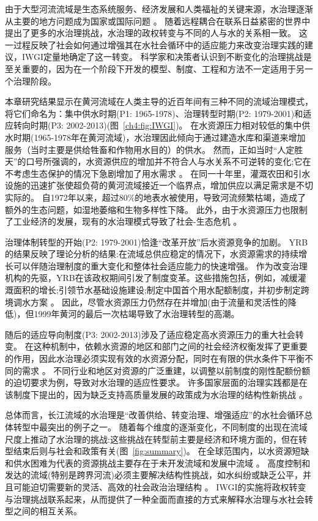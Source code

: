 
由于大型河流流域是生态系统服务、经济发展和人类福祉的关键来源，水治理逐渐从主要的地方问题成为国家或国际问题
\cite{best2019,best2020}。
随着远程耦合在联系日益紧密的世界中提出了更多的水治理挑战，水治理的政权转变与不同的人与水的关系相一致\cite{diaz2019}。
这一过程反映了社会如何通过增强其在水社会循环中的适应能力来改变治理实践的建议，IWGI定量地确定了这一转变\cite{loch2020,turton1999}。
科学家和决策者认识到不断变化的治理挑战是至关重要的，因为在一个阶段下开发的模型、制度、工程和方法不一定适用于另一个治理阶段\cite{reyers2018}。

本章研究结果显示在黄河流域在人类主导的近百年间有三种不同的流域治理模式，将它们命名为：集中供水时期(P1: 1965-1978)、治理转型时期(P2: 1979-2001)和适应转向时期(P3: 2002-2013)(图~\ref{ch4:fig:IWGI})。
在水资源压力相对较低的集中供水时期(1965-1978年在黄河流域)，水治理因此倾向于通过建造水库和渠道来增加服务（当时主要是供给牲畜和作物用水目的）的供水。
然而，正如当时“人定胜天”的口号所强调的，水资源供应的增加并不符合人与水关系不可逆转的变化;它在不考虑生态保护的情况下急剧增加了用水需求
\cite{zhou2020}。
在同一十年里，灌溉农田和引水设施的迅速扩张使超负荷的黄河流域接近一个临界点，增加供应以满足需求是不切实际的\cite{loch2020}。
自1972年以来，超过$80\%$的地表水被使用，导致河流频繁枯竭，造成了额外的生态问题，如湿地萎缩和生物多样性下降\cite{wang2019c}。
此外，由于水资源压力也限制了工业经济的发展，现有的水治理模式导致了社会-生态危机
\cite{wohlfart2016a}。

治理体制转型的开始(P2: 1979-2001)恰逢“改革开放”后水资源竞争的加剧。
YRB的结果反映了理论分析的结果:在流域总供应稳定的情况下，水资源需求的持续增长可以伴随治理制度的重大变化和整体社会适应能力的快速增强\cite{loch2020}。
作为改变治理机构的先驱，YRB在该政权期间引发了制度变革。这些措施包括，例如，减缓灌溉面积的增长;引领节水基础设施建设;制定中国首个用水配额制度，并初步制定跨境调水方案
\cite{wang2019b,long2020,nickum2021}。
因此，尽管水资源压力仍然存在并增加(由于流量和灵活性的降低)，但1999年黄河的最后一次枯竭导致了水治理转型的高潮\cite{wang2019b}。

随后的适应导向制度(P3: 2002-2013)涉及了适应稳定高水资源压力的重大社会转变。
在这种机制中，依赖水资源的地区和部门之间的社会经济权衡发挥了更重要的作用，因此水治理必须实现有效的水资源分配，同时在有限的供水条件下平衡不同的需求
\cite{dalin2015,song2022}。
不同行业和地区对资源的广泛重建，以调整以前制度的刚性配额份额的迫切要求为例，导致对水治理的适应性要求。
许多国家层面的治理实践都是在该制度下提出的，因为缺乏支持高质量发展的政策成为水治理的结构性新挑战
\cite{konar2019}。

总体而言，长江流域的水治理是“改善供给、转变治理、增强适应”的水社会循环总体转型中最突出的例子之一。
随着每个维度的逐渐变化，不同制度的出现在流域尺度上推动了水治理的挑战:这些挑战在转型前主要是经济和环境方面的，但在转型结束后则与社会和政策有关(图~\ref{fig:summary})。
在全球范围内，以水资源短缺和供水困难为代表的资源挑战主要存在于未开发流域和发展中流域
\cite{allan2019,speed2013,liu2012a}。
高度控制和发达的流域(特别是跨界河流)必须主要解决结构性挑战，如水纠纷或缺乏公平，并且可能迫切需要新的灵活、高效的社会政治治理结构
\cite{mirumachi2015}。
IWGI的实施将政权转变与治理挑战联系起来，从而提供了一种全面而直接的方式来解释水治理与水社会转型之间的相互关系。

